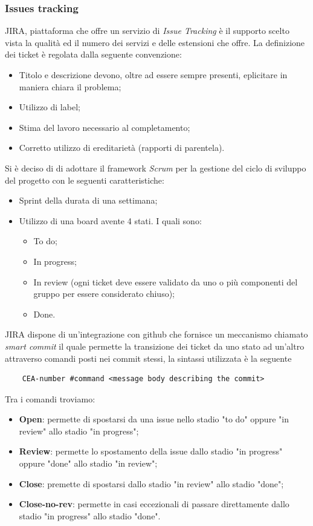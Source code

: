 	\subsubsection{Issues tracking}
	JIRA, piattaforma che offre un servizio di \textit{Issue Tracking} è il supporto scelto vista la qualità ed il numero dei servizi e delle estensioni che offre.
	\newline
	La definizione dei ticket è regolata dalla seguente convenzione:
	\begin{itemize}
		\item Titolo e descrizione devono, oltre ad essere sempre presenti, eplicitare in maniera chiara il problema;
		\item Utilizzo di label;
		\item Stima del lavoro necessario al completamento;
		\item Corretto utilizzo di ereditarietà (rapporti di parentela).
	\end{itemize}
	Si è deciso di di adottare il framework \textit{Scrum} per la gestione del ciclo di sviluppo del progetto con le seguenti caratteristiche:
	\begin{itemize}
		\item Sprint della durata di una settimana;
		\item Utilizzo di una board avente 4 stati.
		I quali sono:
		\begin{itemize}
			\item To do;
			\item In progress;
			\item In review (ogni ticket deve essere validato da uno o più componenti del gruppo per essere considerato chiuso);
			\item Done.
		\end{itemize}
	\end{itemize}

	JIRA dispone di un'integrazione con github che fornisce un meccanismo chiamato \textit{smart commit} il quale permette la transizione dei ticket da uno stato ad un'altro attraverso comandi posti nei commit stessi, la sintassi utilizzata è la seguente
	\begin{lstlisting}
	CEA-number #command <message body describing the commit>
	\end{lstlisting}
	Tra i comandi troviamo:
	\begin{itemize}
		\item \textbf{Open}: permette di spostarsi da una issue nello stadio "to do" oppure "in review" allo stadio "in progress";
		\item \textbf{Review}: permette lo spostamento della issue dallo stadio "in progress" oppure "done" allo stadio "in review";
		\item \textbf{Close}: premette di spostarsi dallo stadio "in review" allo stadio "done";
		\item \textbf{Close-no-rev}: permette in casi eccezionali di passare direttamente dallo stadio "in progress" allo stadio "done".
	\end{itemize}